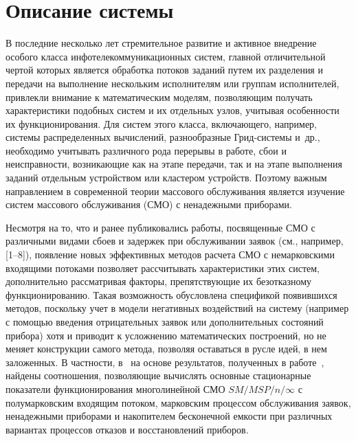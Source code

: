 \begin{multicols}{2}


\label{st\stat}


\section{Описание системы}

В последние несколько лет стремительное развитие и активное внедрение особого 
класса инфотелекоммуникационных систем, главной отличительной чертой которых 
является обработка потоков заданий путем их разделения и передачи на выполнение 
нескольким исполнителям или группам исполнителей, привлекли внимание к 
математическим моделям, позволяющим получать характеристики подобных систем и 
их отдельных узлов, учитывая особенности их функционирования. Для систем этого 
класса, включающего, например, системы распределенных вычислений, разнообразные 
Грид-системы и~др., необходимо учитывать различного рода перерывы в работе, 
сбои и неисправности, возникающие как на этапе передачи, так и на этапе 
выполнения заданий отдельным устройством или кластером устройств. Поэтому 
важным направлением в современной теории массового обслуживания является 
изучение систем массового обслуживания (СМО) с ненадежными приборами. 

\thispagestyle{headings}

 Несмотря на то, что и ранее публиковались работы, 
посвященные СМО с различными видами сбоев и задержек при обслуживании заявок 
(см., например, [1--8]), появление новых эффективных методов расчета СМО с 
немарковскими входящими потоками позволяет рассчитывать характеристики этих 
систем, дополнительно рассматривая факторы, препятствующие их безотказному 
функционированию. Такая возможность обусловлена спецификой появившихся методов, 
поскольку учет в модели негативных воздействий на систему (например с помощью 
введения отрицательных заявок или дополнительных состояний прибора) хотя и 
приводит к усложнению математических построений, но не меняет конструкции 
самого метода, позволяя оставаться в русле идей, в нем заложенных. В частности, 
в~\cite{PSCh06} на основе результатов, полученных в работе~\cite{PCh03}, 
найдены соотношения, позволяющие вычислять основные стационарные показатели 
функционирования многолинейной СМО $SM/MSP/n/\infty$ с полумарковским входящим 
потоком, марковским процессом обслуживания заявок, ненадежными приборами и 
накопителем бесконечной емкости при различных вариантах процессов отказов и 
восстановлений приборов.


\end{multicols}
